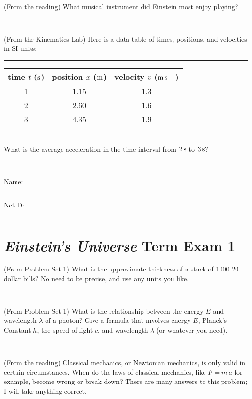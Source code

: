 \documentclass[12pt, letterpaper]{article}
\begin{document}
\vfill ~

\begin{problem} (From the reading)
What musical instrument did Einstein most enjoy playing?
\end{problem}


\vfill ~

\begin{problem} (From the Kinematics Lab)
Here is a data table of times, positions, and velocities in SI units:\\
\rule{1.0in}{0pt}\begin{tabular}{c|c|c}
time $t$ ($\mathrm{s}$) & position $x$ ($\mathrm{m}$) & velocity $v$ ($\mathrm{m}\,\mathrm{s}^{-1}$) \\
\hline
1 & 1.15 & 1.3 \\
2 & 2.60 & 1.6 \\
3 & 4.35 & 1.9 \\
\hline
\end{tabular}\\
What is the average acceleration in the time interval from $2\,\mathrm{s}$ to $3\,\mathrm{s}$?
\end{problem}


\vfill ~


\cleardoublepage



\noindent
Name: \rule[-1ex]{0.60\textwidth}{0.1pt}
NetID: \rule[-1ex]{0.20\textwidth}{0.1pt}

\section*{\textsl{Einstein's Universe} Term Exam 1}
\setcounter{problem}{1}


\begin{problem} (From Problem Set 1)
What is the approximate thickness of a stack of 1000 20-dollar bills?
No need to be precise, and use any units you like.
\end{problem}


\vfill ~

\begin{problem} (From Problem Set 1)
What is the relationship between the energy $E$ and wavelength
$\lambda$ of a photon? Give a formula that involves energy $E$,
Planck's Constant $h$, the speed of light $c$, and wavelength
$\lambda$ (or whatever you need).
\end{problem}

\vfill ~

\begin{problem} (From the reading)
Classical mechanics, or Newtonian mechanics, is only valid in certain
circumstances. When do the laws of classical mechanics, like $F =
m\,a$ for example, become wrong or break down? There are many answers
to this problem; I will take anything correct.
\end{problem}
\end{document}
